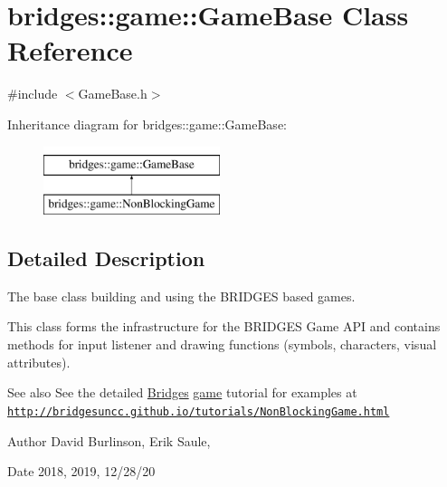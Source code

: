 \hypertarget{classbridges_1_1game_1_1_game_base}{}\section{bridges\+:\+:game\+:\+:Game\+Base Class Reference}
\label{classbridges_1_1game_1_1_game_base}


{\ttfamily \#include $<$Game\+Base.\+h$>$}

Inheritance diagram for bridges\+:\+:game\+:\+:Game\+Base\+:\begin{figure}[H]
\begin{center}
\leavevmode
\includegraphics[height=2.000000cm]{classbridges_1_1game_1_1_game_base}
\end{center}
\end{figure}


\subsection{Detailed Description}
The base class building and using the B\+R\+I\+D\+G\+ES based games. 

This class forms the infrastructure for the B\+R\+I\+D\+G\+ES Game A\+PI and contains methods for input listener and drawing functions (symbols, characters, visual attributes).

\begin{DoxySeeAlso}{See also}
See the detailed \hyperlink{classbridges_1_1_bridges}{Bridges} \hyperlink{namespacebridges_1_1game}{game} tutorial for examples at \href{http://bridgesuncc.github.io/tutorials/NonBlockingGame.html}{\tt http\+://bridgesuncc.\+github.\+io/tutorials/\+Non\+Blocking\+Game.\+html}
\end{DoxySeeAlso}
\begin{DoxyAuthor}{Author}
David Burlinson, Erik Saule, 
\end{DoxyAuthor}
\begin{DoxyDate}{Date}
2018, 2019, 12/28/20 
\end{DoxyDate}
